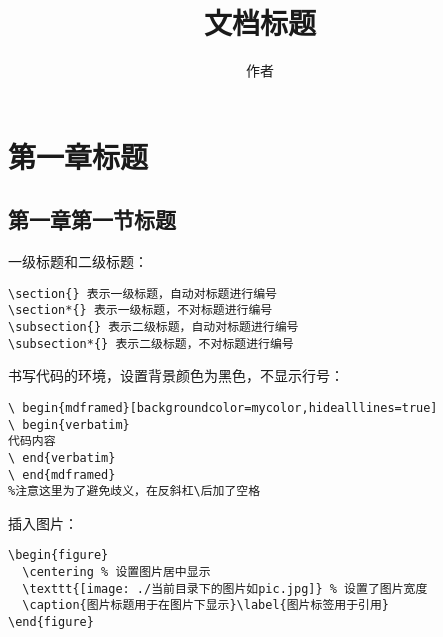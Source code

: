 \documentclass[10pt,onecolumn,a4paper]{article}
\begin{document}
\title{文档标题}
\author{作者}
\maketitle %

\tableofcontents %


\section{第一章标题}
\subsection{第一章第一节标题}
一级标题和二级标题：
\begin{mdframed}[backgroundcolor=mycolor,hidealllines=true]
\begin{verbatim}
\section{} 表示一级标题，自动对标题进行编号
\section*{} 表示一级标题，不对标题进行编号
\subsection{} 表示二级标题，自动对标题进行编号
\subsection*{} 表示二级标题，不对标题进行编号
\end{verbatim}
\end{mdframed}

书写代码的环境，设置背景颜色为黑色，不显示行号：
\begin{mdframed}[backgroundcolor=mycolor,hidealllines=true]
\begin{verbatim}
\ begin{mdframed}[backgroundcolor=mycolor,hidealllines=true]
\ begin{verbatim}
代码内容
\ end{verbatim}
\ end{mdframed}
%注意这里为了避免歧义，在反斜杠\后加了空格
\end{verbatim}
\end{mdframed}

插入图片：
\begin{mdframed}[backgroundcolor=mycolor,hidealllines=true]
\begin{verbatim}
\begin{figure}
  \centering % 设置图片居中显示
  \texttt{[image: ./当前目录下的图片如pic.jpg]} % 设置了图片宽度
  \caption{图片标题用于在图片下显示}\label{图片标签用于引用}
\end{figure}
\end{verbatim}
\end{mdframed}
\end{document}
